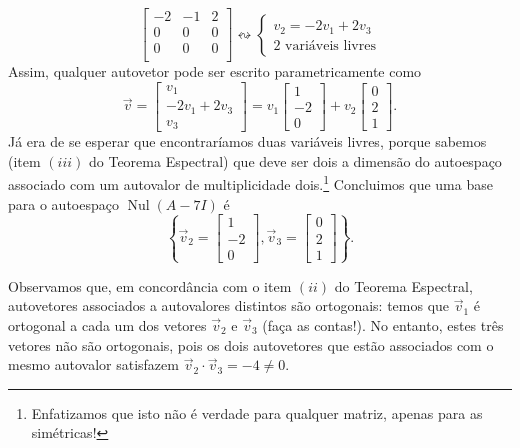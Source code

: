\begin{ex}
\begin{itemize}
\begin{equation}
		\begin{bmatrix}
		-2 & -1 & 2 \\
		0 & 0 & 0 \\
		0 & 0 & 0 \\
		\end{bmatrix} \leftrightsquigarrow
		\left\lbrace
		\begin{array}{l}
		v_2 = - 2 v_1 + 2 v_3  \\
		\text{2 variáveis livres}
		\end{array}
		\right.
		\end{equation} Assim, qualquer autovetor pode ser escrito parametricamente como
		\begin{equation}
		\vec{v} =
		\begin{bmatrix}
		v_1 \\
		- 2 v_1 + 2v_3 \\
		v_3
		\end{bmatrix} = v_1
		\begin{bmatrix}
		1 \\ -2 \\ 0
		\end{bmatrix} + v_2
		\begin{bmatrix}
		0 \\ 2 \\ 1
		\end{bmatrix}.
		\end{equation} Já era de se esperar que encontraríamos duas variáveis livres, porque sabemos (item $(iii)$ do Teorema Espectral) que deve ser dois a dimensão do autoespaço associado com um autovalor de multiplicidade dois.\footnote{Enfatizamos que isto não é verdade para qualquer matriz, apenas para as simétricas!} Concluimos que uma base para o autoespaço $\operatorname{Nul} (A - 7I)$ é
		\begin{equation}
		\left\lbrace
		\vec{v}_2 = \begin{bmatrix}
		1 \\ -2 \\ 0
		\end{bmatrix}, \vec{v}_3 =
		\begin{bmatrix}
		0 \\ 2 \\ 1
		\end{bmatrix}
		\right\rbrace.
		\end{equation}
	\end{itemize}

	Observamos que, em concordância com o item $(ii)$ do Teorema Espectral, autovetores associados a autovalores distintos são ortogonais: temos que $\vec{v}_1$ é ortogonal a cada um dos vetores $\vec{v}_2$ e $\vec{v}_3$ (faça as contas!). No entanto, estes três vetores não são ortogonais, pois os dois autovetores que estão associados com o mesmo autovalor satisfazem $\vec{v}_2 \cdot \vec{v}_3 = -4 \neq 0.$


\end{ex}
